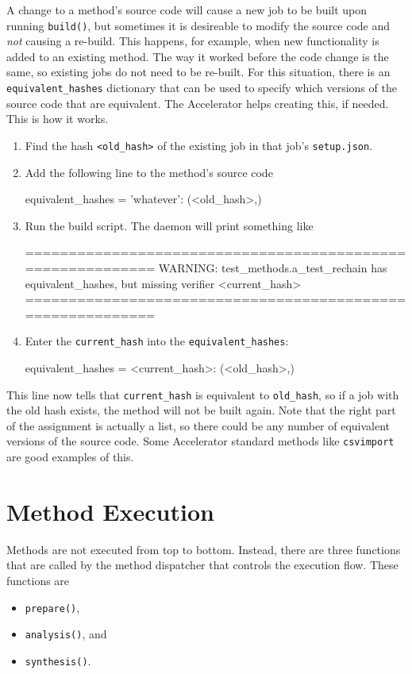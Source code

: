 A change to a method's source code will cause a new job to be built
upon running \texttt{build()}, but sometimes it is
desireable to modify the source code and \textsl{not} causing a
re-build.  This happens, for example, when new functionality is added
to an existing method.  The way it worked before the code change is
the same, so existing jobs do not need to be re-built.  For this
situation, there is an \texttt{equivalent\_hashes} dictionary that can
be used to specify which versions of the source code that are
equivalent.  The Accelerator helps creating this, if needed.  This is
how it works.
\begin{enumerate}
\item Find the hash \texttt{<old\_hash>} of the existing job in that job's \texttt{setup.json}.
\item Add the following line to the method's source code
\begin{python}
equivalent_hashes = {'whatever': (<old_hash>,)}
\end{python}
\item Run the build script.  The daemon will print something like
\begin{shell}
===========================================================
WARNING: test_methods.a_test_rechain has equivalent_hashes,
but missing verifier <current_hash>
===========================================================
\end{shell}
\item Enter the \texttt{current\_hash} into the \texttt{equivalent\_hashes}:
\begin{python}
equivalent_hashes = {<current_hash>: (<old_hash>,)}
\end{python}
\end{enumerate}
This line now tells that \texttt{current\_hash} is equivalent
to \texttt{old\_hash}, so if a job with the old hash exists, the
method will not be built again.  Note that the right part of the
assignment is actually a list, so there could be any number of
equivalent versions of the source code.  Some Accelerator standard
methods like \texttt{csvimport} are good examples of this.





\section{Method Execution}

Methods are not executed from top to bottom.  Instead, there are three
functions that are called by the method dispatcher that controls the
execution flow.  These functions are
\begin{itemize}
\item [] \texttt{prepare()},
\item [] \texttt{analysis()}, and
\item [] \texttt{synthesis()}.
\end{itemize}



